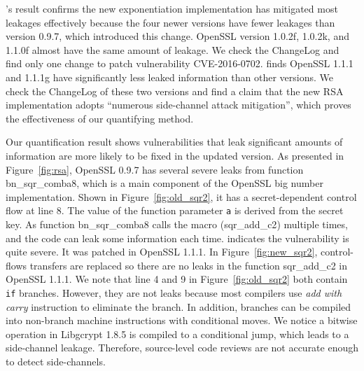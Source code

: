 \tool{}'s result confirms the new exponentiation implementation has mitigated 
most leakages effectively because the four newer versions have fewer
leakages than version 0.9.7, which introduced this change.
OpenSSL version 1.0.2f, 1.0.2k, and 1.1.0f almost have the
same amount of leakage. We check the ChangeLog and find only one change to
patch vulnerability CVE-2016-0702. 
\tool{} finds OpenSSL 1.1.1 and 1.1.1g have significantly less
leaked information than other versions.
We check the ChangeLog of these two versions and find a claim that
the new RSA implementation adopts ``numerous side-channel attack mitigation'', 
which proves the effectiveness of our quantifying method.



Our quantification result shows vulnerabilities
that leak significant amounts of information
are more likely to be fixed in the updated version.
As presented in Figure~\ref{fig:rsa}, 
OpenSSL 0.9.7 has several severe leaks from
function \textsf{bn\_sqr\_comba8}, which is a main 
component of the OpenSSL big number implementation.
Shown in Figure~\ref{fig:old_sqr2}, it has a 
secret-dependent control flow at line 8.
The value of the function parameter \texttt{a} is derived from
the secret key. 
As function \textsf{bn\_sqr\_comba8}
calls the macro (\textsf{sqr\_add\_c2}) multiple times, 
and the code can leak some information each time.
\tool{} indicates the vulnerability is quite severe. 
It was patched in OpenSSL 1.1.1\@. In 
Figure~\ref{fig:new_sqr2}, control-flows transfers are replaced
so there are no leaks in the function
\textsf{sqr\_add\_c2} in OpenSSL 1.1.1\@. We note
that line 4 and 9 in Figure~\ref{fig:old_sqr2} both contain \texttt{if} branches.
However, they are not leaks because
most compilers use \emph{add with carry} instruction to eliminate the branch.
In addition, branches can be compiled into non-branch machine instructions 
with conditional moves. 
We notice a bitwise operation in Libgcrypt 1.8.5 is compiled to a conditional 
jump, which leads to a side-channel leakage.
Therefore, source-level code reviews are not accurate
enough to detect side-channels. 

